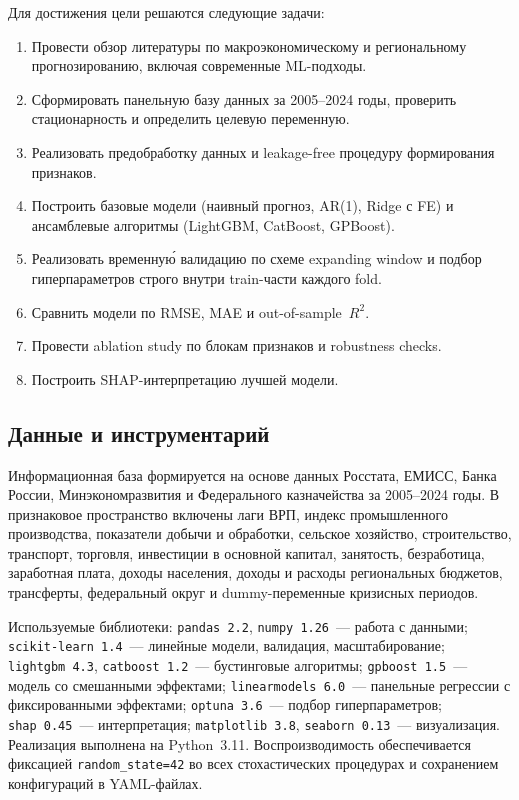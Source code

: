 \documentclass[12pt,a4paper]{article}
\begin{document}
Для достижения цели решаются следующие задачи:
\begin{enumerate}
  \item Провести обзор литературы по макроэкономическому и региональному
        прогнозированию, включая современные ML-подходы.
  \item Сформировать панельную базу данных за 2005--2024 годы, проверить
        стационарность и определить целевую переменную.
  \item Реализовать предобработку данных и leakage-free процедуру
        формирования признаков.
  \item Построить базовые модели (наивный прогноз, AR(1), Ridge с FE)
        и ансамблевые алгоритмы (LightGBM, CatBoost, GPBoost).
  \item Реализовать временну\'{ю} валидацию по схеме expanding window
        и подбор гиперпараметров строго внутри train-части каждого fold.
  \item Сравнить модели по RMSE, MAE и out-of-sample~$R^2$.
  \item Провести ablation study по блокам признаков и robustness checks.
  \item Построить SHAP-интерпретацию лучшей модели.
\end{enumerate}

\subsection{Данные и инструментарий}

Информационная база формируется на основе данных Росстата, ЕМИСС,
Банка России, Минэкономразвития и Федерального казначейства за 2005--2024
годы. В признаковое пространство включены лаги ВРП, индекс промышленного
производства, показатели добычи и обработки, сельское хозяйство,
строительство, транспорт, торговля, инвестиции в основной капитал, занятость,
безработица, заработная плата, доходы населения, доходы и расходы
региональных бюджетов, трансферты, федеральный округ и dummy-переменные
кризисных периодов.

Используемые библиотеки: \texttt{pandas~2.2}, \texttt{numpy~1.26}~--- работа
с данными; \texttt{scikit-learn~1.4}~--- линейные модели, валидация,
масштабирование; \texttt{lightgbm~4.3}, \texttt{catboost~1.2}~---
бустинговые алгоритмы; \texttt{gpboost~1.5}~--- модель со смешанными
эффектами; \texttt{linearmodels~6.0}~--- панельные регрессии с
фиксированными эффектами; \texttt{optuna~3.6}~--- подбор гиперпараметров;
\texttt{shap~0.45}~--- интерпретация; \texttt{matplotlib~3.8},
\texttt{seaborn~0.13}~--- визуализация. Реализация выполнена на Python~3.11.
Воспроизводимость обеспечивается фиксацией \texttt{random\_state=42} во всех
стохастических процедурах и сохранением конфигураций в YAML-файлах.
\end{document}
